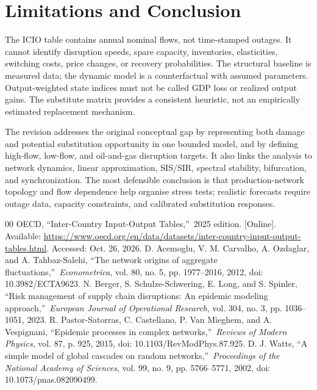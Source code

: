 \documentclass[conference,a4paper,twoside]{IEEEtran}
\begin{document}
\section{Limitations and Conclusion}
The ICIO table contains annual nominal flows, not time-stamped outages. It cannot identify disruption speeds, spare capacity, inventories, elasticities, switching costs, price changes, or recovery probabilities. The structural baseline is measured data; the dynamic model is a counterfactual with assumed parameters. Output-weighted state indices must not be called GDP loss or realized output gains. The substitute matrix provides a consistent heuristic, not an empirically estimated replacement mechanism.

The revision addresses the original conceptual gap by representing both damage and potential substitution opportunity in one bounded model, and by defining high-flow, low-flow, and oil-and-gas disruption targets. It also links the analysis to network dynamics, linear approximation, SIS/SIR, spectral stability, bifurcation, and synchronization. The most defensible conclusion is that production-network topology and flow dependence help organise stress tests; realistic forecasts require outage data, capacity constraints, and calibrated substitution responses.

\begin{thebibliography}{00}
 OECD, \textquotedblleft Inter-Country Input-Output Tables,\textquotedblright\ 2025 edition. [Online]. Available: \url{https://www.oecd.org/en/data/datasets/inter-country-input-output-tables.html}. Accessed: Oct. 26, 2026.
 D. Acemoglu, V. M. Carvalho, A. Ozdaglar, and A. Tahbaz-Salehi, \textquotedblleft The network origins of aggregate fluctuations,\textquotedblright\ \emph{Econometrica}, vol. 80, no. 5, pp. 1977--2016, 2012, doi: 10.3982/ECTA9623.
 N. Berger, S. Schulze-Schwering, E. Long, and S. Spinler, \textquotedblleft Risk management of supply chain disruptions: An epidemic modeling approach,\textquotedblright\ \emph{European Journal of Operational Research}, vol. 304, no. 3, pp. 1036--1051, 2023.
 R. Pastor-Satorras, C. Castellano, P. Van Mieghem, and A. Vespignani, \textquotedblleft Epidemic processes in complex networks,\textquotedblright\ \emph{Reviews of Modern Physics}, vol. 87, p. 925, 2015, doi: 10.1103/RevModPhys.87.925.
 D. J. Watts, \textquotedblleft A simple model of global cascades on random networks,\textquotedblright\ \emph{Proceedings of the National Academy of Sciences}, vol. 99, no. 9, pp. 5766--5771, 2002, doi: 10.1073/pnas.082090499.
\end{thebibliography}
\balance
\end{document}
